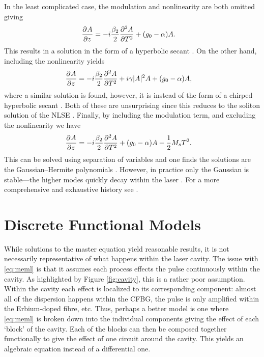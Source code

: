 In the least complicated case, the modulation and nonlinearity are both omitted giving
\begin{align*}
\pdiff{A}{z} &= - i \frac{\beta_2}{2}\pdiff[2]{A}{T} + \left( g_0 - \alpha \right) A.
\end{align*}
This results in a solution in the form of a hyperbolic secant \cite{haus1975, haus1986, haus1992}. On the other hand, including the nonlinearity yields
\begin{align*}
\pdiff{A}{z} &= - i \frac{\beta_2}{2}\pdiff[2]{A}{T} + i \gamma |A|^2 A + \left( g_0 - \alpha \right) A,
\end{align*}
where a similar solution is found, however, it is instead of the form of a chirped hyperbolic secant \cite{haus1991, usechak}. Both of these are unsurprising since this reduces to the soliton solution of the NLSE \cite{ferreira}. Finally, by including the modulation term, and excluding the nonlinearity we have
\begin{align*}
\pdiff{A}{z} &= - i \frac{\beta_2}{2}\pdiff[2]{A}{T} + \left( g_0 - \alpha \right) A - \frac{1}{2}M_s T^2.
\end{align*}
This can be solved using separation of variables and one finds the solutions are the Gaussian--Hermite polynomials \cite{burgoyne2014, hausbook, haus1975, haus1996, haus2000, kartner, tamura, usechak}. However, in practice only the Gaussian is stable---the higher modes quickly decay within the laser \cite{hausbook, haus1975, haus1996, haus2000}. For a more comprehensive and exhaustive history see \cite{haus2000}. \\

\section{Discrete Functional Models}
While solutions to the master equation yield reasonable results, it is not necessarily representative of what happens within the laser cavity. The issue with \eqref{eq:meml} is that it assumes each process effects the pulse continuously within the cavity. As highlighted by Figure \ref{fig:cavity}, this is a rather poor assumption. Within the cavity each effect is localized to its corresponding component: almost all of the dispersion happens within the CFBG, the pulse is only amplified within the Erbium-doped fibre, etc. Thus, perhaps a better model is one where \eqref{eq:meml} is broken down into the individual components giving the effect of each `block' of the cavity. Each of the blocks can then be composed together functionally to give the effect of one circuit around the cavity. This yields an algebraic equation instead of a differential one. \\

